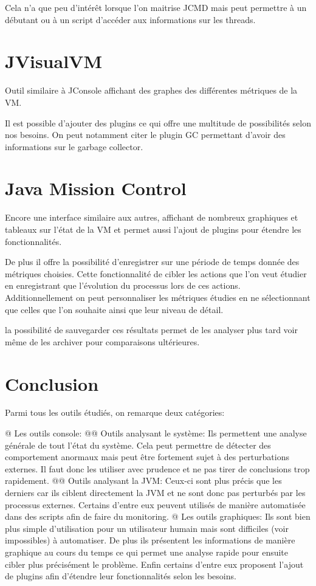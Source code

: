 \documentclass{report}
\begin{document}
			Cela n'a que peu d'intérêt lorsque l'on maitrise JCMD mais peut permettre à un débutant ou à un script d'accéder aux informations sur les threads.
			
		\section{JVisualVM}
			Outil similaire à JConsole affichant des graphes des différentes métriques de la VM.
			
			Il est possible d'ajouter des plugins ce qui offre une multitude de possibilités selon nos besoins.
			On peut notamment citer le plugin GC permettant d'avoir des informations sur le garbage collector.
			
		\section{Java Mission Control}
			Encore une interface similaire aux autres, affichant de nombreux graphiques et tableaux sur l'état de la VM et permet aussi l'ajout de plugins pour étendre les fonctionnalités.
			
			De plus il offre la possibilité d'enregistrer sur une période de temps donnée des métriques choisies.
			Cette fonctionnalité de cibler les actions que l'on veut étudier en enregistrant que l'évolution du processus lors de ces actions.
			Additionnellement on peut personnaliser les métriques étudies en ne sélectionnant que celles que l'on souhaite ainsi que leur niveau de détail.
			
			la possibilité de sauvegarder ces résultats permet de les analyser plus tard voir même de les archiver pour comparaisons ultérieures.
			
			
		\section{Conclusion}
			Parmi tous les outils étudiés, on remarque deux catégories:
			\begin{easylist}[itemize]
				@ Les outils console:
				@@ Outils analysant le système: Ils permettent une analyse générale de tout l'état du système.
				Cela peut permettre de détecter des comportement anormaux mais peut être fortement sujet à des perturbations externes. 
				Il faut donc les utiliser avec prudence et ne pas tirer de conclusions trop rapidement.
				@@ Outils analysant la JVM: Ceux-ci sont plus précis que les derniers car ils ciblent directement la JVM et ne sont donc pas perturbés par les processus externes.
				Certains d'entre eux peuvent utilisés de manière automatisée dans des scripts afin de faire du monitoring.
				@ Les outils graphiques: Ils sont bien plus simple d'utilisation pour un utilisateur humain mais sont difficiles (voir impossibles) à automatiser.
				De plus ils présentent les informations de manière graphique au cours du temps ce qui permet une analyse rapide pour ensuite cibler plus précisément le problème.
				Enfin certains d'entre eux proposent l'ajout de plugins afin d'étendre leur fonctionnalités selon les besoins.
			\end{easylist}

			
\end{document}
